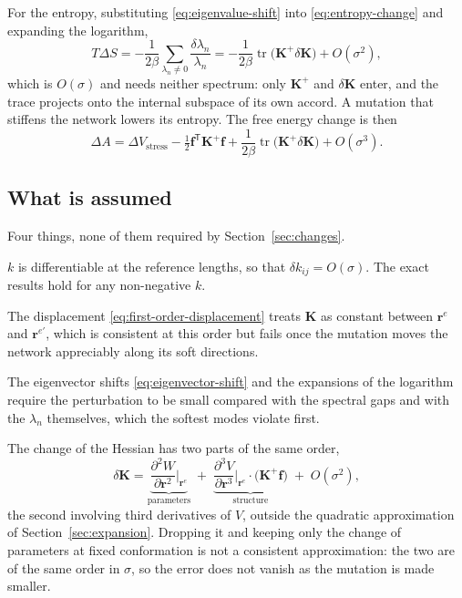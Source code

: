 \documentclass[11pt]{article}
\newcommand{\rr}{\mathbf{r}}
\newcommand{\KK}{\mathbf{K}}
\newcommand{\re}{\rr^{e}}
\newcommand{\rem}{\rr^{e\prime}}   %
\newcommand{\dkij}{\delta k_{ij}}
\begin{document}
For the entropy, substituting \eqref{eq:eigenvalue-shift} into \eqref{eq:entropy-change} and expanding the logarithm,
\begin{equation}
\boxed{
T\Delta S = -\frac{1}{2\beta} \sum_{\lambda_n \ne 0} \frac{\delta\lambda_n}{\lambda_n}
= -\frac{1}{2\beta} \operatorname{tr}\big(\KK^{+} \delta\KK\big) + O(\sigma^{2}) ,
}
\label{eq:first-order-entropy-change}
\end{equation}
which is $O(\sigma)$ and needs neither spectrum: only $\KK^{+}$ and $\delta\KK$ enter, and the trace projects onto the internal subspace of its own accord.
A mutation that stiffens the network lowers its entropy.
The free energy change is then
\begin{equation}
\boxed{
\Delta A = \Delta V_{\text{stress}} - \tfrac12 \mathbf{f}^{\mathsf T}\KK^{+}\mathbf{f}
+ \frac{1}{2\beta} \operatorname{tr}\big(\KK^{+} \delta\KK\big) + O(\sigma^{3}) .
}
\label{eq:first-order-free-energy-change}
\end{equation}

\subsection*{What is assumed}

Four things, none of them required by Section~\ref{sec:changes}.

$k$ is differentiable at the reference lengths, so that $\dkij = O(\sigma)$.
The exact results hold for any non-negative $k$.

The displacement \eqref{eq:first-order-displacement} treats $\KK$ as constant between $\re$ and $\rem$, which is consistent at this order but fails once the mutation moves the network appreciably along its soft directions.

The eigenvector shifts \eqref{eq:eigenvector-shift} and the expansions of the logarithm require the perturbation to be small compared with the spectral gaps and with the $\lambda_n$ themselves, which the softest modes violate first.

The change of the Hessian has two parts of the same order,
\begin{equation}
\delta\KK =
\underbrace{\frac{\partial^2 W}{\partial \rr^2}\bigg|_{\re}}_{\text{parameters}}
\;+\;
\underbrace{\frac{\partial^3 V}{\partial \rr^3}\bigg|_{\re} \cdot \big(\KK^{+}\mathbf{f}\big)}_{\text{structure}}
\;+\; O(\sigma^{2}),
\label{eq:hessian-change}
\end{equation}
the second involving third derivatives of $V$, outside the quadratic approximation of Section~\ref{sec:expansion}.
Dropping it and keeping only the change of parameters at fixed conformation is not a consistent approximation: the two are of the same order in $\sigma$, so the error does not vanish as the mutation is made smaller.
\end{document}
